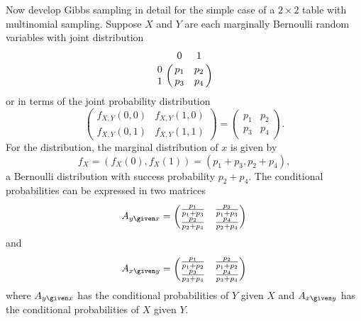 \documentclass[12pt]{article}
\begin{document}
Now develop Gibbs sampling in detail for the simple case of a \( 2
\times 2 \) table with multinomial sampling. Suppose \( X \) and \( Y \)
are each marginally Bernoulli random variables with joint distribution
\[
    \bordermatrix{
        & 0 & 1 \cr
        0 & p_1 & p_2 \cr
        1 & p_3 & p_4}
\] or in terms of the joint probability distribution
\[
    \begin{pmatrix}
        f_{X,Y}(0,0) & f_{X,Y}(1,0) \\
        f_{X,Y}(0,1) & f_{X,Y}(1,1)
    \end{pmatrix}
    =
    \begin{pmatrix}
        p_1 & p_2 \\
        p_3 & p_4
    \end{pmatrix}
    .
\] For the distribution, the marginal distribution of \( x \) is given
by
\[
    f_X = (f_X(0), f_X(1)) = (p_1 + p_3, p_2 + p_4),
\] a Bernoulli distribution with success probability \( p_2 + p_4 \).
The conditional probabilities can be expressed in two matrices
\[
    A_{y \given x} =
    \begin{pmatrix}
        \frac{p_1}{p_1 + p_3} & \frac{p_3}{p_1 + p_3} \\
        \frac{p_2}{p_2 + p_4} & \frac{p_4}{p_2 + p_4}
    \end{pmatrix}
\] and
\[
    A_{x \given y} =
    \begin{pmatrix}
        \frac{p_1}{p_1 + p_2} & \frac{p_2}{p_1 + p_2} \\
        \frac{p_3}{p_3 + p_4} & \frac{p_4}{p_3 + p_4}
    \end{pmatrix}
\] where \( A_{y \given x} \) has the conditional probabilities of \( Y \)
given \( X \) and \( A_{x \given y} \) has the conditional probabilities
of \( X \) given \( Y \).
\end{document}
